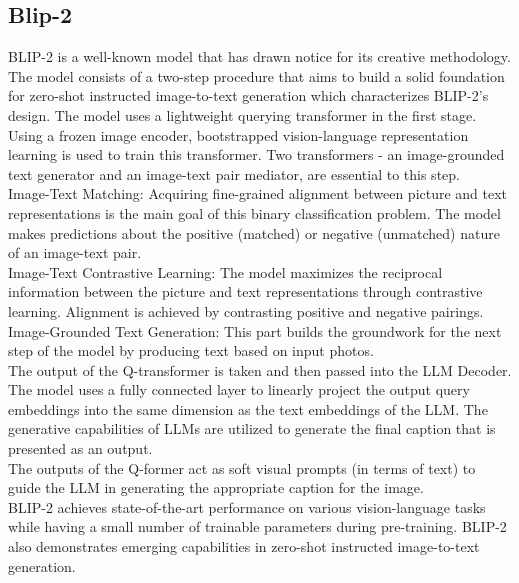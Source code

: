 \documentclass[conference]{IEEEtran}
\begin{document}
\subsection{Blip-2}
{
BLIP-2 \citep{li2023blip} is a well-known model that has drawn notice for its creative methodology. The model consists of a two-step procedure that aims to build a solid foundation for zero-shot instructed image-to-text generation which characterizes BLIP-2's design. The model uses a lightweight querying transformer in the first stage. Using a frozen image encoder, bootstrapped vision-language representation learning is used to train this transformer. Two transformers - an image-grounded text generator and an image-text pair mediator, are essential to this step.
\\

Image-Text Matching: Acquiring fine-grained alignment between picture and text representations is the main goal of this binary classification problem. The model makes predictions about the positive (matched) or negative (unmatched) nature of an image-text pair.
\\

Image-Text Contrastive Learning: The model maximizes the reciprocal information between the picture and text representations through contrastive learning. Alignment is achieved by contrasting positive and negative pairings.
\\

Image-Grounded Text Generation: This part builds the groundwork for the next step of the model by producing text based on input photos.
\\

The output of the Q-transformer is taken and then passed into the LLM Decoder. The model uses a fully connected layer to linearly project the output query embeddings into the same dimension as the text embeddings of the LLM. The generative capabilities of LLMs are utilized to generate the final caption that is presented as an output.
\\

The outputs of the Q-former act as soft visual prompts (in terms of text) to guide the LLM in generating the appropriate caption for the image.
\\

BLIP-2 achieves state-of-the-art performance on various vision-language tasks while having a small number of trainable parameters during pre-training. BLIP-2 also demonstrates emerging capabilities in zero-shot instructed image-to-text generation.
}
\end{document}
